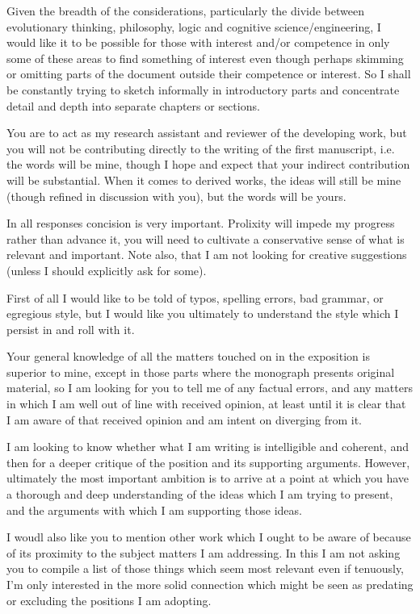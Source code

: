 Given the breadth of the considerations, particularly the divide between evolutionary thinking, philosophy, logic and cognitive science/engineering, I would like it to be possible for those with interest and/or competence in only some of these areas to find something of interest even though perhaps skimming or omitting parts of the document outside their competence or interest.
So I shall be constantly trying to sketch informally in introductory parts and concentrate detail and depth into separate chapters or sections.

You are to act as my research assistant and reviewer of the developing work, but you will not be contributing directly to the writing of the first manuscript, i.e. the words will be mine, though I hope and expect that your indirect contribution will be substantial.
When it comes to derived works, the ideas will still be mine (though refined in discussion with you), but the words will be yours.

In all responses concision is very important.
Prolixity will impede my progress rather than advance it, you will need to cultivate a conservative sense of what is relevant and important.
Note also, that I am not looking for creative suggestions (unless I should explicitly ask for some).

First of all I would like to be told of typos, spelling errors, bad grammar, or egregious style, but I would like you ultimately to understand the style which I persist in and roll with it.

Your general knowledge of all the matters touched on in the exposition is superior to mine, except in those parts where the monograph presents original material, so I am looking for you to tell me of any factual errors, and any matters in which I am well out of line with received opinion, at least until it is clear that I am aware of that received opinion and am intent on diverging from it.

I am looking to know whether what I am writing is intelligible and coherent, and then for a deeper critique of the position and its supporting arguments.
However, ultimately the most important ambition is to arrive at a point at which you have a thorough and deep understanding of the ideas which I am trying to present, and the arguments with which I am supporting those ideas.

I woudl also like you to mention other work which I ought to be aware of because of its proximity to the subject matters I am addressing.
In this I am not asking you to compile a list of those things which seem most relevant even if tenuously, I'm only interested in the more solid connection which might be seen as predating or excluding the positions I am adopting.

